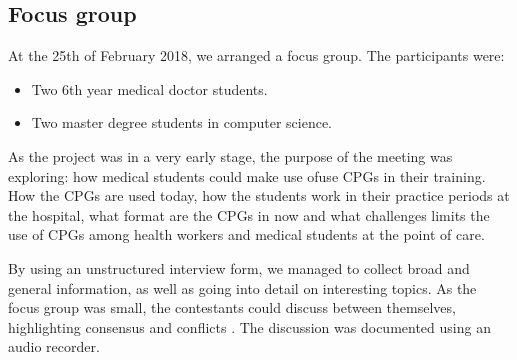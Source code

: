 \subsection{Focus group}
At the 25th of February 2018, we arranged a focus group. The participants were:
\begin{itemize}
	\item Two 6th year medical doctor students.
	\item Two master degree students in computer science.
\end{itemize}

As the project was in a very early stage, the purpose of the meeting was exploring: how medical students could make use ofuse CPGs in their training. How the CPGs are used today, how the students work in their practice periods at the hospital, what format are the CPGs in now and what challenges limits the use of CPGs among health workers and medical students at the point of care.

By using an unstructured interview form, we managed to collect broad and general information, as well as going into detail on interesting topics. As the focus group was small, the contestants could discuss between themselves, highlighting consensus and conflicts \parencite{Preece2015}. The discussion was documented using an audio recorder.

